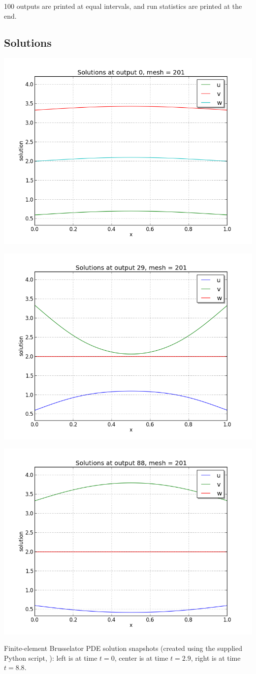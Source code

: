 \documentclass[letterpaper,10pt,english]{sphinxmanual}
\begin{document}
100 outputs are printed at equal intervals, and run statistics
are printed at the end.


\subsection{Solutions}
\label{c_serial:id24}
\includegraphics[width=0.300\linewidth]{plot-ark_brusselator1D_FEM_1.png}

\includegraphics[width=0.300\linewidth]{plot-ark_brusselator1D_FEM_2.png}

\includegraphics[width=0.300\linewidth]{plot-ark_brusselator1D_FEM_3.png}

Finite-element Brusselator PDE solution snapshots (created using the
supplied Python script, ): left is at time
\(t=0\), center is at time \(t=2.9\), right is at time
\(t=8.8\).
\end{document}
